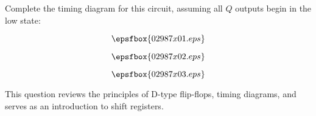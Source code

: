 

Complete the timing diagram for this circuit, assuming all $Q$ outputs begin in the low state:

$$\epsfbox{02987x01.eps}$$

$$\epsfbox{02987x02.eps}$$







$$\epsfbox{02987x03.eps}$$







This question reviews the principles of D-type flip-flops, timing diagrams, and serves as an introduction to shift registers.




